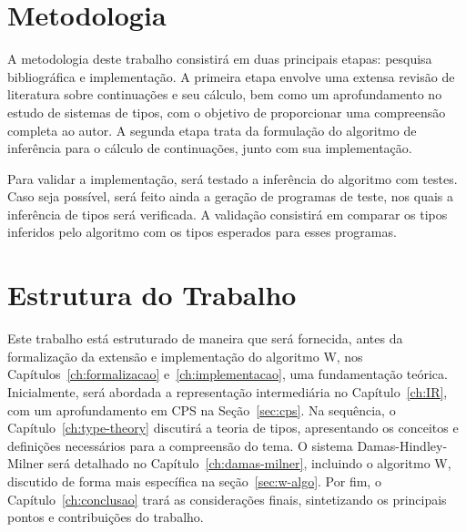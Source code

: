 \section{Metodologia}\label{sec:metodologia}

A metodologia deste trabalho consistirá em duas principais etapas: pesquisa bibliográfica e implementação.
A primeira etapa envolve uma extensa revisão de literatura sobre continuações e seu cálculo, bem como um aprofundamento no estudo de sistemas de tipos, com o objetivo de proporcionar uma compreensão completa ao autor.
A segunda etapa trata da formulação do algoritmo de inferência para o cálculo de continuações, junto com sua implementação.

Para validar a implementação, será testado a inferência do algoritmo com testes.
Caso seja possível, será feito ainda a geração de programas de teste, nos quais a inferência de tipos será verificada.
A validação consistirá em comparar os tipos inferidos pelo algoritmo com os tipos esperados para esses programas.

\section{Estrutura do Trabalho}\label{sec:estrutura-trabalho}

Este trabalho está estruturado de maneira que será fornecida, antes da formalização da extensão e implementação do algoritmo W, nos Capítulos~\ref{ch:formalizacao} e~\ref{ch:implementacao}, uma fundamentação teórica.
Inicialmente, será abordada a representação intermediária no Capítulo~\ref{ch:IR}, com um aprofundamento em CPS na Seção~\ref{sec:cps}.
Na sequência, o Capítulo~\ref{ch:type-theory} discutirá a teoria de tipos, apresentando os conceitos e definições necessários para a compreensão do tema.
O sistema Damas-Hindley-Milner será detalhado no Capítulo~\ref{ch:damas-milner}, incluindo o algoritmo W, discutido de forma mais específica na seção~\ref{sec:w-algo}.
Por fim, o Capítulo~\ref{ch:conclusao} trará as considerações finais, sintetizando os principais pontos e contribuições do trabalho.
